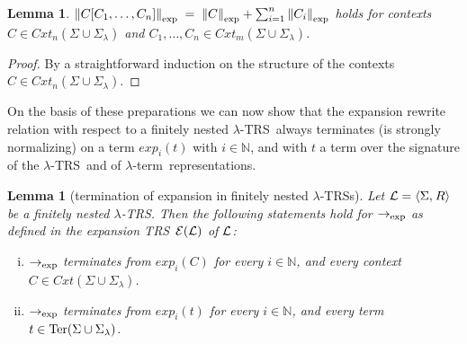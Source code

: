 \documentclass[
submission
]{dmtcs-episciences-tampered}
\newcommand{\fap}[2]{#1({#2})}
\newcommand{\indap}[2]{#1 _{#2}}
\newcommand{\subap}[2]{#1 _{#2}}
\newcommand{\bap}{\subap}
\newcommand{\nb}{\nobreakdash}
\newcommand{\nf}{\normalfont}
\newcommand{\tuple}[1]{\langle #1 \rangle}
\newcommand{\tuplespace}{\hspace*{0.5pt}}
\newcommand{\pair}[2]{\tuple{#1, \tuplespace #2}}
\newcommand{\nat}{\mathbb{N}}
\newcommand{\bter}{t}
\newcommand{\asig}{\Sigma}
\newcommand{\asiglambda}{\indap{\asig}{\lambda}}
\newcommand{\arules}{R}
\newcommand{\alTRS}{{\cal L}}
\newcommand{\TRS}{TRS}
\newcommand{\stermsover}{\text{\nf Ter}}
\newcommand{\termsover}{\fap{\stermsover}}
\newcommand{\scontextsover}{\textit{Cxt}}
\newcommand{\contextsover}{\fap{\scontextsover}}
\newcommand{\scontextsnover}{\bap{\scontextsover}}
\newcommand{\contextsnover}[1]{\fap{\scontextsnover{#1}}}
\newcommand{\cxtap}[2]{{#1}[#2]}
\newcommand{\acxt}{C}
\newcommand{\acxtap}{\cxtap{\acxt}}
\newcommand{\acxti}{\bap{\acxt}}
\newcommand{\expsize}[1]{\left\lVert{#1}\right\rVert\bap{}{\scriptexp}}
\newcommand{\sexpandTRS}{{\cal E}}
\newcommand{\expandTRSwrt}{\fap{\sexpandTRS}}
\newcommand{\sred}{\to}
\newcommand{\sredi}{\indap{\sred}}
\newcommand{\scriptexp}{\text{\nf exp}}
\newcommand{\sexpand}{\textit{exp}}
\newcommand{\sexpandi}{\indap{\sexpand}}
\newcommand{\expandi}[1]{\fap{\sexpandi{#1}}}
\newcommand{\sexpred}{\sredi{\scriptexp}}
\newcommand{\lambdaterm}{$\lambda$\nb-term}
\newcommand{\lTRS}{$\lambda$\hspace*{-0.5pt}\nb-\hspace*{-0.5pt}\TRS}
\newcommand{\lTRSs}{\lTRS{s}}
\theoremstyle{plain}
\newtheorem{lemma}[theorem]{Lemma}
\theoremstyle{definition}
\begin{document}
\begin{lemma}\label{lem:expsize:cxts}
  $
  \expsize{ \acxtap{\acxti{1},\ldots,\acxti{n}} } 
    \; = \;
  \expsize{ \acxt }  
    + \sum_{i=1}^{n} 
        \expsize{\acxti{i}} 
  $      
  holds for contexts $\acxt\in\contextsnover{n}{\asig\cup\asiglambda}$ 
  and $\acxti{1},\ldots,\acxti{n}\in\contextsnover{m}{\asig\cup\asiglambda}$. 
\end{lemma}

\begin{proof}
  By a straightforward induction on the structure of the contexts~$\acxt\in\contextsnover{n}{\asig\cup\asiglambda}$.
\end{proof}


On the basis of these preparations we can now show that the expansion rewrite relation with respect to a finitely nested \lTRS\
always terminates (is strongly normalizing) on a term $\expandi{i}{\bter}$ with $i\in\nat$,
and with $\bter$ a term over the signature of the \lTRS\ and of \lambdaterm\ representations.


\begin{lemma}[termination of expansion in finitely nested \lTRSs]\label{lem:expred:terminates}
  Let $\alTRS = \pair{\asig}{\arules}$ be a {finitely nested} \lTRS. 
  Then the following statements hold for $\sexpred$ as defined in the expansion TRS~$\expandTRSwrt{\alTRS}$ of $\alTRS$:
  \begin{enumerate}[(i)]\setlength{\itemsep}{0ex}
    \item{}\label{it:1:lem:expred:terminates}
      $\sexpred$ terminates from $\expandi{i}{\acxt}$ for every $i\in\nat$, and every context $\acxt\in\contextsover{\asig\cup\asiglambda}$. 
    \item{}\label{it:2:lem:expred:terminates}  
      $\sexpred$ terminates from $\expandi{i}{\bter}$ for every $i\in\nat$, and every term $\bter\in\termsover{\asig\cup\asiglambda}$. 
  \end{enumerate}
\end{lemma}
\end{document}

